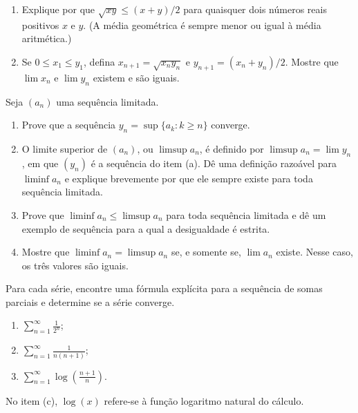\begin{exercise}\label{ex:2-4-6}
\begin{enumerate}[label=\alph*)]
\item Explique por que $\sqrt{xy}\leq(x+y)/2$ para quaisquer dois números reais positivos $x$ e $y$. (A média geométrica é sempre menor ou igual à média aritmética.)
\item Se $0\leq x_1\leq y_1$, defina $x_{n+1}=\sqrt{x_ny_n}$ e $y_{n+1}=(x_n+y_n)/2$. Mostre que $\lim x_n$ e $\lim y_n$ existem e são iguais.
\end{enumerate}
\end{exercise}

\begin{exercise}\label{ex:2-4-7}
Seja $(a_n)$ uma sequência limitada.
\begin{enumerate}[label=\alph*)]
\item Prove que a sequência $y_n=\sup\{a_k:k\geq n\}$ converge.
\item O limite superior de $(a_n)$, ou $\limsup a_n$, é definido 
por $\limsup a_n=\lim y_n$, em que $(y_n)$ é a sequência do item (a). 
Dê uma definição razoável para $\liminf a_n$ 
e explique brevemente por que ele sempre existe para toda sequência limitada.
\item Prove que $\liminf a_n\leq\limsup a_n$ para toda sequência limitada 
e dê um exemplo de sequência para a qual a desigualdade é estrita.
\item Mostre que $\liminf a_n=\limsup a_n$ se, e somente se, $\lim a_n$ existe. Nesse caso, os três valores são iguais.
\end{enumerate}
\end{exercise}

\begin{exercise}\label{ex:2-4-8}
Para cada série, encontre uma fórmula explícita para a sequência de somas parciais e determine se a série converge.
\begin{enumerate}[label=\alph*)]
\item $\displaystyle\sum_{n=1}^{\infty}\frac1{2^n}$;
\item $\displaystyle\sum_{n=1}^{\infty}\frac1{n(n+1)}$;
\item $\displaystyle\sum_{n=1}^{\infty}\log\left(\frac{n+1}{n}\right)$.
\end{enumerate}
No item (c), $\log(x)$ refere-se à função logaritmo natural do cálculo.
\end{exercise}

